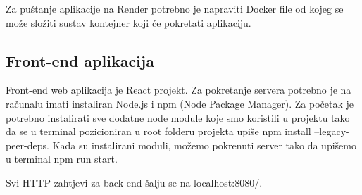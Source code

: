 			\bigskip

			Za puštanje aplikacije na Render potrebno je napraviti Docker file od kojeg se može složiti sustav kontejner koji će pokretati aplikaciju.

			\bigskip

			\subsection{Front-end aplikacija}

			Front-end web aplikacija je React projekt. Za pokretanje servera potrebno je na računalu imati instaliran Node.js i npm (Node Package Manager). Za početak je potrebno instalirati sve dodatne node module koje smo koristili u projektu tako da se u terminal pozicioniran u root folderu projekta upiše npm install --legacy-peer-deps. Kada su instalirani moduli, možemo pokrenuti server tako da upišemo u terminal npm run start.

			Svi HTTP zahtjevi za back-end šalju se na localhost:8080/.


			\eject
